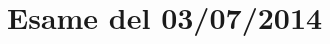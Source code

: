 \documentclass[\main/main.tex]{subfiles}
\begin{document}
\section{Esame del 03/07/2014}

\clearpage

\end{document}
